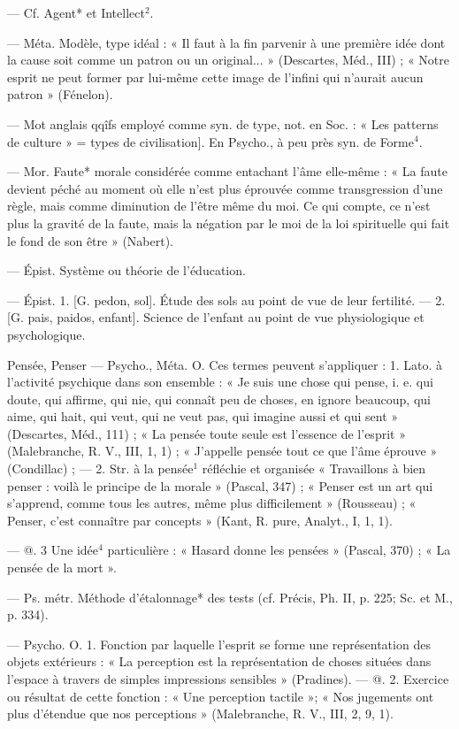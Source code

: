 \begin{itemize}[leftmargin=1cm, label=, itemsep=1pt]
 — Cf. Agent* et Intellect$^2$.

 — Méta. Modèle, type idéal :
« Il faut à la fin parvenir à une première idée dont la cause soit comme
un patron ou un original... » (Descartes, Méd., III) ; « Notre esprit ne
peut former par lui-même cette
image de l'infini qui n’aurait aucun
patron » (Fénelon).

 — Mot anglais qqîfs employé
comme syn. de type, not. en Soc. :
« Les patterns de culture » = types
de civilisation]. En Psycho., à peu
près syn. de Forme$^4$.

 — Mor. Faute* morale considérée
comme entachant l'âme elle-même : « La faute devient péché
au moment où elle n’est plus éprouvée comme transgression d’une
règle, mais comme diminution de
l’être même du moi. Ce qui compte,
ce n’est plus la gravité de la faute,
mais la négation par le moi de la loi
spirituelle qui fait le fond de son
être » (Nabert).

 — Épist. Système ou
théorie de l’éducation.

 — Épist. 1. [G. pedon, sol].
Étude des sols au point de vue de
leur fertilité. — 2. [G. pais, paidos,
enfant]. Science de l’enfant au point
de vue physiologique et psychologique.

Pensée, Penser\ib{} — Psycho., Méta. O.
Ces termes peuvent s’appliquer :
1. Lato. à l’activité psychique dans
son ensemble : « Je suis une chose
qui pense, i. e. qui doute, qui
affirme, qui nie, qui connaît peu de
choses, en ignore beaucoup, qui
aime, qui hait, qui veut, qui ne veut
pas, qui imagine aussi et qui sent »
(Descartes, Méd., 111) ; « La pensée
toute seule est l'essence de l'esprit »
(Malebranche, R. V., III, 1, 1) ;
« J'appelle pensée tout ce que l’âme
éprouve » (Condillac) ; — 2. Str. à
la pensée$^1$ réfléchie et organisée
« Travaillons à bien penser : voilà le
principe de la morale » (Pascal, 347) ;
« Penser est un art qui s’apprend,
comme tous les autres, même plus
difficilement » (Rousseau) ; « Penser,
c’est connaître par concepts »
(Kant, R. pure, Analyt., I, 1, 1).

— @. 3 Une idée$^4$ particulière :
« Hasard donne les pensées » (Pascal,
370) ; « La pensée de la mort ».

 — Ps. métr. Méthode
d’étalonnage* des tests (cf. Précis,
Ph. II, p. 225; Sc. et M., p. 334).

 — Psycho. O. 1. Fonction
par laquelle l'esprit se forme une
représentation des objets extérieurs :
« La perception est la représentation de choses situées dans l’espace à
travers de simples impressions sensibles » (Pradines). — @. 2. Exercice
ou résultat de cette fonction : « Une
perception tactile »; « Nos jugements
ont plus d’étendue que nos perceptions » (Malebranche, R. V., III,
2, 9, 1).


\end{itemize}

